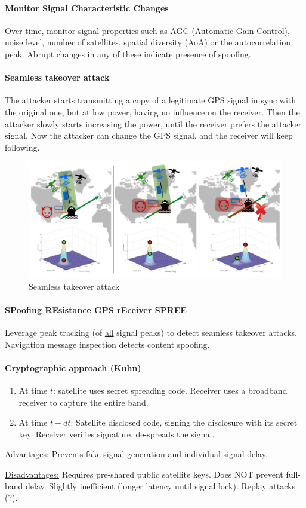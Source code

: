 \paragraph{Monitor Signal Characteristic Changes}
Over time, monitor signal properties such as AGC (Automatic Gain Control), noise level, number of satellites, spatial diversity (AoA) or the autocorrelation peak.
Abrupt changes in any of these indicate presence of spoofing.

\paragraph{Seamless takeover attack}
The attacker starts transmitting a copy of a legitimate GPS signal in sync with the original one, but at low power, having no influence on the receiver.
Then the attacker slowly starts increasing the power, until the receiver prefers the attacker signal.
Now the attacker can change the GPS signal, and the receiver will keep following. 

\begin{figure}
	\centering
	\includegraphics[scale=0.4]{images/4-seamless-takeover.png}
	\caption{Seamless takeover attack}
	\label{fig:seamless-takeover}
\end{figure}

\paragraph{SPoofing REsistance GPS rEceiver SPREE}
Leverage peak tracking (of \underline{all} signal peaks) to detect seamless takeover attacks.
Navigation message inspection detects content spoofing.

\paragraph{Cryptographic approach (Kuhn)}
\begin{enumerate}
	\item At time $t$: satellite uses secret spreading code.
	Receiver uses a broadband receiver to capture the entire band.
	\item At time $t+dt$: Satellite disclosed code, signing the disclosure with its secret key.
	Receiver verifies signature, de-spreads the signal.
\end{enumerate}

\underline{Advantages:}
Prevents fake signal generation and individual signal delay.

\underline{Disadvantages:}
Requires pre-shared public satellite keys.
Does NOT prevent full-band delay.
Slightly inefficient (longer latency until signal lock).
Replay attacks (?).

